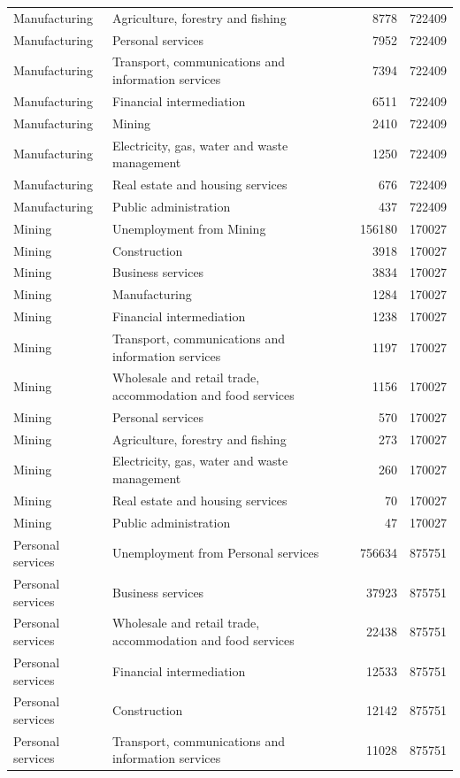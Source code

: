 \begin{longtable}{llrr}
Manufacturing & Agriculture, forestry and fishing & 8778 & 722409 \\
Manufacturing & Personal services & 7952 & 722409 \\
Manufacturing & Transport, communications and information services & 7394 & 722409 \\
Manufacturing & Financial intermediation & 6511 & 722409 \\
Manufacturing & Mining & 2410 & 722409 \\
Manufacturing & Electricity, gas, water and waste management & 1250 & 722409 \\
Manufacturing & Real estate and housing services & 676 & 722409 \\
Manufacturing & Public administration & 437 & 722409 \\
Mining & Unemployment from Mining & 156180 & 170027 \\
Mining & Construction & 3918 & 170027 \\
Mining & Business services & 3834 & 170027 \\
Mining & Manufacturing & 1284 & 170027 \\
Mining & Financial intermediation & 1238 & 170027 \\
Mining & Transport, communications and information services & 1197 & 170027 \\
Mining & Wholesale and retail trade, accommodation and food services & 1156 & 170027 \\
Mining & Personal services & 570 & 170027 \\
Mining & Agriculture, forestry and fishing & 273 & 170027 \\
Mining & Electricity, gas, water and waste management & 260 & 170027 \\
Mining & Real estate and housing services & 70 & 170027 \\
Mining & Public administration & 47 & 170027 \\
Personal services & Unemployment from Personal services & 756634 & 875751 \\
Personal services & Business services & 37923 & 875751 \\
Personal services & Wholesale and retail trade, accommodation and food services & 22438 & 875751 \\
Personal services & Financial intermediation & 12533 & 875751 \\
Personal services & Construction & 12142 & 875751 \\
Personal services & Transport, communications and information services & 11028 & 875751 \\

\end{longtable}
